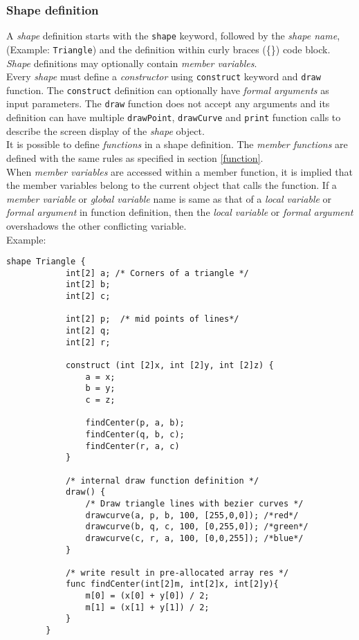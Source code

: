     \subsubsection{Shape definition}
    A \textit{shape} definition starts with the \texttt{shape} keyword, followed by the \textit{shape name},(Example: \texttt{Triangle}) and the definition within curly braces (\{\}) code block. \textit{Shape} definitions may optionally contain \textit{member variables}.\\
    
    Every \textit{shape} must define a \textit{constructor} using \texttt{construct} keyword and \texttt{draw} function. The \texttt{construct} definition can optionally have \textit{formal arguments} as input parameters. The \texttt{draw} function does not accept any arguments and its definition can have multiple \texttt{drawPoint}, \texttt{drawCurve} and \texttt{print} function calls to describe the screen display of the \textit{shape} object.\\

    It is possible to define \textit{functions} in a shape definition. The \textit{member functions} are defined with the same rules as specified in section \ref{function}.\\
    When \textit{member variables} are accessed within a member function, it is implied that the member variables belong to the current object that calls the function. If a \textit{member variable} or \textit{global variable} name is same as that of a \textit{local variable} or \textit{formal argument} in function definition, then the \textit{local variable} or \textit{formal argument} overshadows the other conflicting variable.\\

    Example:\\
    \begin{lstlisting}[style=sol]
        shape Triangle {
            int[2] a; /* Corners of a triangle */
            int[2] b;
            int[2] c;

            int[2] p;  /* mid points of lines*/
            int[2] q;
            int[2] r;

            construct (int [2]x, int [2]y, int [2]z) {
                a = x;
                b = y;
                c = z;

                findCenter(p, a, b);
                findCenter(q, b, c);
                findCenter(r, a, c)
            }

            /* internal draw function definition */
            draw() {
                /* Draw triangle lines with bezier curves */
                drawcurve(a, p, b, 100, [255,0,0]); /*red*/
                drawcurve(b, q, c, 100, [0,255,0]); /*green*/
                drawcurve(c, r, a, 100, [0,0,255]); /*blue*/
            }

            /* write result in pre-allocated array res */
            func findCenter(int[2]m, int[2]x, int[2]y){
                m[0] = (x[0] + y[0]) / 2;
                m[1] = (x[1] + y[1]) / 2;
            }
        }
    \end{lstlisting}

